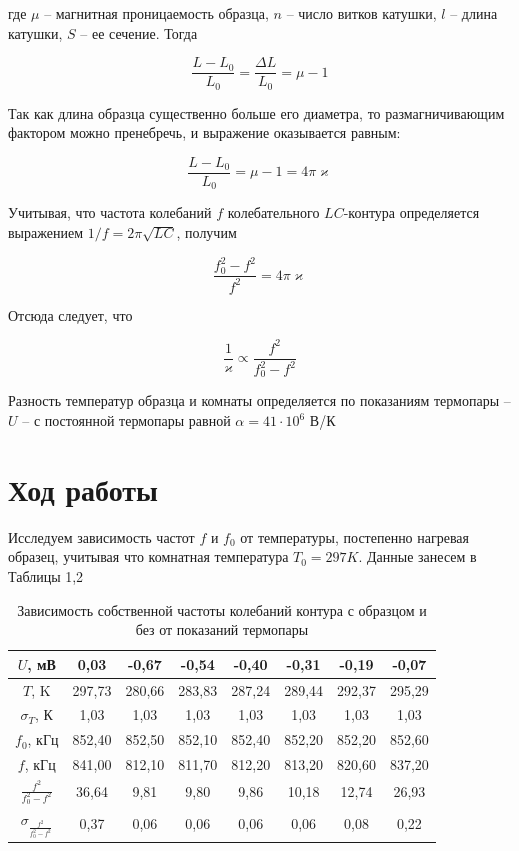 \documentclass[a4paper,12pt]{article}
\begin{document}
где $\mu$ -- магнитная проницаемость образца, $n$ -- число витков катушки, $l$ -- длина катушки, $S$ -- ее сечение. Тогда

$$
	\frac{L - L_0}{L_0} = \frac{\Delta L}{L_0} = \mu - 1
$$

Так как длина образца существенно больше его диаметра, то размагничивающим фактором можно пренебречь, и выражение оказывается равным:

$$
	\frac{L - L_0}{L_0} = \mu - 1 = 4 \pi \varkappa
$$

\newpage

Учитывая, что частота колебаний $f$ колебательного $LC$-контура определяется выражением $1/f = 2 \pi \sqrt{LC}$, получим

$$
	\frac{f_0^2 - f^2}{f^2} = 4 \pi \varkappa
$$

Отсюда следует, что

$$
	\frac{1}{\varkappa} \propto \frac{f^2}{f_0^2 - f^2}
$$

Разность температур образца и комнаты определяется по показаниям термопары -- $U$ -- с постоянной термопары равной $\alpha = 41 \cdot 10^6 $ В/К

\section*{Ход работы}

Исследуем зависимость частот $f$ и $f_0$ от температуры, постепенно нагревая образец, учитывая что комнатная температура $T_0 = 297 K$. Данные занесем в Таблицы 1,2


\begin{table}[h!]
\centering
\caption{Зависимость собственной частоты колебаний контура с образцом и без от показаний термопары}
\begin{tabular}{|c|c|c|c|c|c|c|c|}
\hline
$U$, мВ & 0,03 & -0,67 & -0,54 & -0,40 & -0,31 & -0,19 & -0,07 \\ \hline
$T$, K & 297,73 & 280,66 & 283,83 & 287,24 & 289,44 & 292,37 & 295,29 \\ \hline
$\sigma_T$, К & 1,03 & 1,03 & 1,03 & 1,03 & 1,03 & 1,03 & 1,03 \\ \hline
$f_0$, кГц & 852,40 & 852,50 & 852,10 & 852,40 & 852,20 & 852,20 & 852,60 \\ \hline
$f$, кГц & 841,00 & 812,10 & 811,70 & 812,20 & 813,20 & 820,60 & 837,20 \\ \hline
$\frac{f^2}{f_0^2 - f^2}$  & 36,64 & 9,81 & 9,80 & 9,86 & 10,18 & 12,74 & 26,93 \\ \hline
$\sigma_{\frac{f^2}{f_0^2 - f^2}}$ & 0,37 & 0,06 & 0,06 & 0,06 & 0,06 & 0,08 & 0,22 \\ \hline
\end{tabular}
\end{table}
\end{document}
